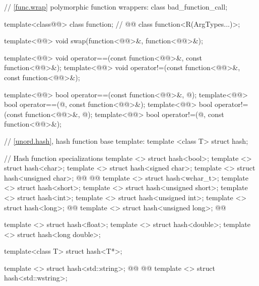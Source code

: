 \documentclass[american,twoside]{book}
\begin{document}
\begin{codeblock}
{  // \marktr{}\ref{func.wrap} polymorphic function wrappers:
  class bad_function_call;

  template<class@@> class function; // 
  @@
    class function<R(ArgTypes...)>;

  template<@@>
    void swap(function<@@>&, function<@@>&);

  template<@@>
    void operator==(const function<@@>&, const function<@@>&);
  template<@@>
    void operator!=(const function<@@>&, const function<@@>&);

  template<@@>
    bool operator==(const function<@@>&, @\unspecnull@);
  template<@@>
    bool operator==(@\unspecnull@, const function<@@>&);
  template<@@>
    bool operator!=(const function<@@>&, @\unspecnull@);
  template<@@>
    bool operator!=(@\unspecnull@, const function<@@>&);

  // \marktr{}\ref{unord.hash}, hash function base template:
  template <class T> struct hash;

  // Hash function specializations
  template <> struct hash<bool>;
  template <> struct hash<char>;
  template <> struct hash<signed char>;
  template <> struct hash<unsigned char>;
  @@
  @@
  template <> struct hash<wchar_t>;
  template <> struct hash<short>;
  template <> struct hash<unsigned short>;
  template <> struct hash<int>;
  template <> struct hash<unsigned int>;
  template <> struct hash<long>;
  @@
  template <> struct hash<unsigned long>;
  @@

  template <> struct hash<float>;
  template <> struct hash<double>;
  template <> struct hash<long double>;

  template<class T> struct hash<T*>;

  template <> struct hash<std::string>;
  @@
  @@
  template <> struct hash<std::wstring>;
}
\end{codeblock}
\end{document}
